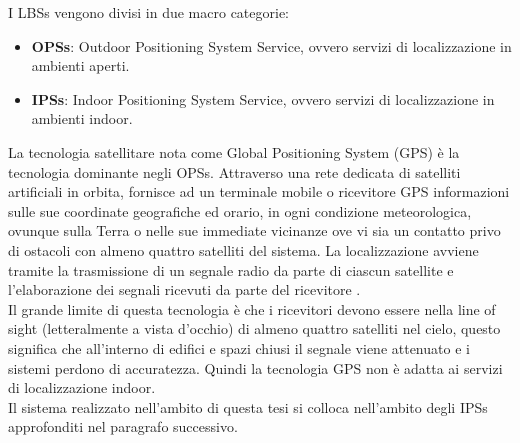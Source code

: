 I LBSs vengono divisi in due macro categorie:
\begin{itemize}
	\item \textbf{OPSs}: Outdoor Positioning System Service, ovvero servizi di localizzazione in ambienti aperti.
	\item \textbf{IPSs}: Indoor Positioning System Service, ovvero servizi di localizzazione in ambienti indoor.
\end{itemize}
La tecnologia satellitare nota come Global Positioning System (GPS) è la tecnologia dominante negli OPSs. Attraverso una rete dedicata di satelliti artificiali in orbita, fornisce ad un terminale mobile o ricevitore GPS informazioni sulle sue coordinate geografiche ed orario, in ogni condizione meteorologica, ovunque sulla Terra o nelle sue immediate vicinanze ove vi sia un contatto privo di ostacoli con almeno quattro satelliti del sistema. La localizzazione avviene tramite la trasmissione di un segnale radio da parte di ciascun satellite e l'elaborazione dei segnali ricevuti da parte del ricevitore \cite{gps}.\\ 
Il grande limite di questa tecnologia è che i ricevitori devono essere nella line of sight (letteralmente a vista d'occhio) di almeno quattro satelliti nel cielo, questo significa che all'interno di edifici e spazi chiusi il segnale viene attenuato e i sistemi perdono di accuratezza. Quindi la tecnologia GPS non è adatta ai servizi di localizzazione indoor.\\
Il sistema realizzato nell'ambito di questa tesi si colloca nell'ambito degli IPSs approfonditi nel paragrafo successivo.


